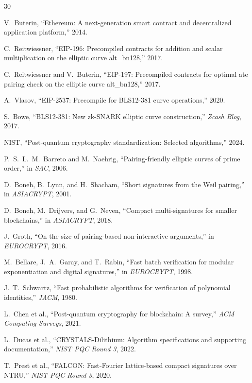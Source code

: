\documentclass[11pt,a4paper]{article}
\begin{document}

\begin{thebibliography}{30}

V.~Buterin, ``Ethereum: A next-generation smart contract and decentralized application platform,'' 2014.

C.~Reitwiessner, ``EIP-196: Precompiled contracts for addition and scalar multiplication on the elliptic curve alt\_bn128,'' 2017.

C.~Reitwiessner and V.~Buterin, ``EIP-197: Precompiled contracts for optimal ate pairing check on the elliptic curve alt\_bn128,'' 2017.

A.~Vlasov, ``EIP-2537: Precompile for BLS12-381 curve operations,'' 2020.

S.~Bowe, ``BLS12-381: New zk-SNARK elliptic curve construction,'' \emph{Zcash Blog}, 2017.

{NIST}, ``Post-quantum cryptography standardization: Selected algorithms,'' 2024.

P.~S.~L.~M.~Barreto and M.~Naehrig, ``Pairing-friendly elliptic curves of prime order,'' in \emph{SAC}, 2006.

D.~Boneh, B.~Lynn, and H.~Shacham, ``Short signatures from the Weil pairing,'' in \emph{ASIACRYPT}, 2001.

D.~Boneh, M.~Drijvers, and G.~Neven, ``Compact multi-signatures for smaller blockchains,'' in \emph{ASIACRYPT}, 2018.

J.~Groth, ``On the size of pairing-based non-interactive arguments,'' in \emph{EUROCRYPT}, 2016.

M.~Bellare, J.~A.~Garay, and T.~Rabin, ``Fast batch verification for modular exponentiation and digital signatures,'' in \emph{EUROCRYPT}, 1998.

J.~T.~Schwartz, ``Fast probabilistic algorithms for verification of polynomial identities,'' \emph{JACM}, 1980.

L.~Chen et al., ``Post-quantum cryptography for blockchain: A survey,'' \emph{ACM Computing Surveys}, 2021.

L.~Ducas et al., ``CRYSTALS-Dilithium: Algorithm specifications and supporting documentation,'' \emph{NIST PQC Round 3}, 2022.

T.~Prest et al., ``FALCON: Fast-Fourier lattice-based compact signatures over NTRU,'' \emph{NIST PQC Round 3}, 2020.


\end{thebibliography}
\end{document}
